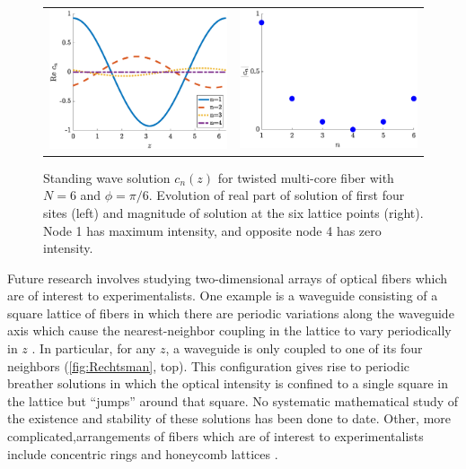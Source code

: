 \documentclass[12pt,reqno,oneside,hidelinks]{article}
\begin{document}
\begin{figure}
\begin{center}
\begin{tabular}{cc}
\includegraphics[width=8cm]{images/evenholestandingwave.eps} &
\includegraphics[width=8cm]{images/evenholeamps.eps}
\end{tabular}
\end{center}
\caption{Standing wave solution $c_n(z)$ for twisted multi-core fiber with $N = 6$ and $\phi = \pi/6$. Evolution of real part of solution of first four sites (left) and magnitude of solution at the six lattice points (right). Node 1 has maximum intensity, and opposite node 4 has zero intensity.}
\label{fig:twistcn}
\end{figure}

Future research involves studying two-dimensional arrays of optical fibers which are of interest to experimentalists. One example is a waveguide consisting of a square lattice of fibers in which there are periodic variations along the waveguide axis which cause the nearest-neighbor coupling in the lattice to vary periodically in $z$ \cite{Mukherjee2020}. In particular, for any $z$, a waveguide is only coupled to one of its four neighbors (\cref{fig:Rechtsman}, top). This configuration gives rise to periodic breather solutions in which the optical intensity is confined to a single square in the lattice but ``jumps'' around that square. No systematic mathematical study of the existence and stability of these solutions has been done to date. Other, more complicated,arrangements of fibers which are of interest to experimentalists include concentric rings and honeycomb lattices \cite{Lumer2013}.
\end{document}
